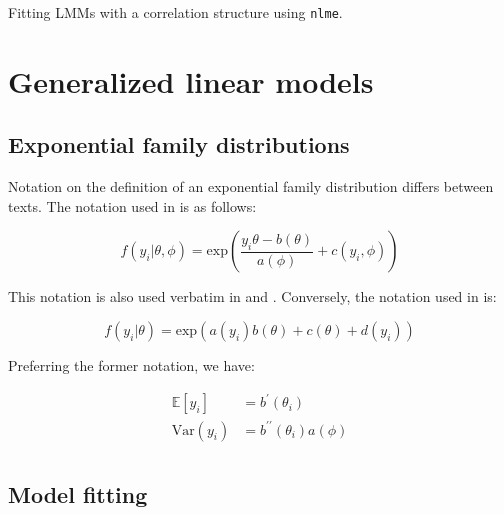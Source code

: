 \documentclass{report}
\begin{document}
\begin{listing}[h!]
\inputminted{r}{Example-Code/nlme_correlation_structure.R}
\caption{Fitting LMMs with a correlation structure using \texttt{nlme}.}
\label{listing:nlme-example}
\end{listing}

\section{Generalized linear models}\label{sec:tools-glm}

\subsection{Exponential family distributions} \label{sec:exponential-family-glms}

Notation on the definition of an exponential family distribution differs between texts. The notation used in \cite{faraway_extending_2016} is as follows:

\begin{equation}\label{eq:glm-exp-fam-dist-1}
    f(y_i|\theta, \phi) = \text{exp}\left(\frac{y_i\theta - b(\theta)}{a(\phi)} + c(y_i, \phi)\right)
\end{equation}

This notation is also used verbatim in \cite{agresti_foundations_2015} and \cite{hardin_generalized_2018}. Conversely, the notation used in \cite{dobson_introduction_2018} is:

\begin{equation}\label{eq:glm-exp-fam-dist-2}
    f(y_i|\theta) = \text{exp}\left(a(y_i)b(\theta) + c(\theta) + d(y_i)\right)
\end{equation}

Preferring the former notation, we have:

\begin{equation}\label{eq:glm-exp-fam-dist-properties}
    \begin{aligned}
        \mathbb{E}[y_i] &= b^\prime(\theta_i) \\
        \text{Var}(y_i) &= b^{\prime\prime}(\theta_i)a(\phi) \\
    \end{aligned}
\end{equation}

\subsection{Model fitting}
\end{document}
